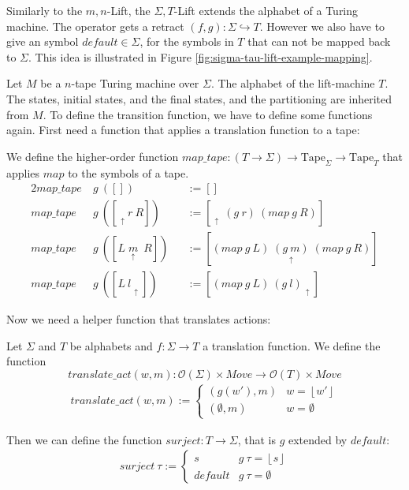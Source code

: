 \documentclass{psartcl}
\newcommand{\from}{:}
\renewcommand{\to}{\rightarrow}
\newcommand{\Opt}{\mathcal{O}}
\newcommand{\Some}[1]{\left\lfloor #1\right\rfloor}
\renewcommand{\None}{\emptyset}
\newcommand{\tape}[1]{[ #1 ]}
\newcommand{\tapePointer}[1]{\; \underset{\uparrow}{#1} \;}
\newcommand{\Tape}{\txt{Tape}}
\newcommand{\Tau}{T}
\newcommand{\txt}[1]{\text{#1}}
\begin{document}
Similarly to the $m,n$-Lift, the $\Sigma,\Tau$-Lift extends the alphabet of a Turing machine.  The operator gets a retract
$(f,g) \from \Sigma \hookrightarrow \Tau$.  However we also have to give an symbol $default \in \Sigma$, for the symbols in $\Tau$ that can not be mapped back to
$\Sigma$.  This idea is illustrated in Figure \ref{fig:sigma-tau-lift-example-mapping}.

Let $M$ be a $n$-tape Turing machine over $\Sigma$.  The alphabet of the lift-machine $\Tau$.  The states, initial states, and the final states, and
the partitioning are inherited from $M$.  To define the transition function, we have to define some functions again.  First need a function that
applies a translation function to a tape:
\begin{definition}
  We define the higher-order function
  $map\_tape \from (\Tau \to \Sigma) \to \Tape_\Sigma \to \Tape_\Tau$
  that applies $map$ to the symbols of a tape.
  \begin{alignat*}{2}
    map\_tape&~g~(\tape{})                  &&:= \tape{} \\
    map\_tape&~g~(\tape{\tapePointer{} r~R})   &&:= \tape{\tapePointer{}~(g~r)~(map~g~R)} \\
    map\_tape&~g~(\tape{L \tapePointer{m}~R})  &&:= \tape{(map~g~L) \tapePointer{(g~m)} (map~g~R)} \\
    map\_tape&~g~(\tape{L~l \tapePointer{}})   &&:= \tape{(map~g~L)~(g~l) \tapePointer{}}
  \end{alignat*}
\end{definition}

Now we need a helper function that translates actions:
\begin{definition}
  \label{def:translate-action}
  Let $\Sigma$ and $\Tau$ be alphabets and $f \from \Sigma \to \Tau$ a translation function.  We define the function
  $$translate\_act(w, m) \from \Opt(\Sigma) \times Move \to \Opt(\Tau) \times Move$$
  \begin{align*}
    translate\_act (w, m) :=
    \begin{cases}
      (g(w'), m)  & w = \Some{w'} \\
      (\None, m)  & w = \None
    \end{cases}
  \end{align*}
\end{definition}

Then we can define the function $surject \from \Tau \to \Sigma$, that is $g$ extended by $default$:
\begin{align*}
  surject~\tau :=
  \begin{cases}
    s         & g~\tau = \Some{s} \\
    default   & g~\tau = \None
  \end{cases}
\end{align*}
\end{document}
